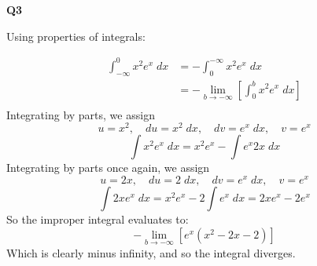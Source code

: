 \documentclass[12pt, a4paper]{article}
\begin{document}
\textbf{Q3}

Using properties of integrals:

\begin{align*}
    \int^0_{-\infty} x^2e^x \;dx & = -\int^{-\infty}_0 x^2e^x \;dx\\
    & = -\lim_{b \to -\infty} \left[\int^{b}_0 x^2e^x \;dx\right]\\
\end{align*}
Integrating by parts, we assign
\[
    u = x^2, \quad du = x^2\;dx, \quad
    dv = e^x\;dx, \quad v = e^x
\]
\[
    \int x^2e^x\;dx = x^2e^x - \int e^x2x\;dx
\]
Integrating by parts once again, we assign
\[
    u = 2x, \quad du = 2\;dx, \quad
    dv = e^x\;dx, \quad v = e^x
\]
\[
    \int 2xe^x\;dx = x^2e^x - 2\int e^x\;dx = 2xe^x - 2e^x
\]
So the improper integral evaluates to:
\[
    -\lim_{b \to -\infty} \left[e^x\left(x^2 - 2x - 2\right)\right]
\]
Which is clearly minus infinity, and so the integral diverges.
\end{document}
